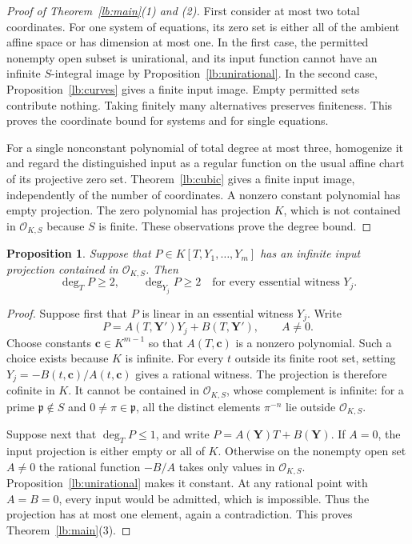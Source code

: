 \documentclass[11pt,a4paper]{article}
\newtheorem{proposition}[theorem]{Proposition}
\theoremstyle{definition}
\newcommand{\OKS}{\mathcal O_{K,S}}
\begin{document}
\begin{proof}[Proof of Theorem~\ref{lb:main}(1) and (2)]
First consider at most two total coordinates. For one system of
equations, its zero set is either all of the ambient affine space
or has dimension at most one. In the first case, the permitted
nonempty open subset is unirational, and its input function cannot
have an infinite $S$-integral image by Proposition~\ref{lb:unirational}.
In the second case, Proposition~\ref{lb:curves} gives a finite
input image. Empty permitted sets contribute nothing. Taking
finitely many alternatives preserves finiteness. This proves the
coordinate bound for systems and for single equations.

For a single nonconstant polynomial of total degree at most three,
homogenize it and regard the distinguished input as a regular
function on the usual affine chart of its projective zero set.
Theorem~\ref{lb:cubic} gives a finite input image, independently
of the number of coordinates. A nonzero constant polynomial has
empty projection. The zero polynomial has projection $K$, which
is not contained in $\OKS$ because $S$ is finite. These observations
prove the degree bound.
\end{proof}

\begin{proposition}\label{lb:individual-degrees}
Suppose that $P\in K[T,Y_1,\ldots,Y_m]$ has an infinite input
projection contained in $\OKS$. Then
\[
                \deg_T P\ge2,
    \qquad \deg_{Y_j}P\ge2
          \quad\text{for every essential witness }Y_j.
\]
\end{proposition}
\begin{proof}
Suppose first that $P$ is linear in an essential witness $Y_j$.
Write
\[
             P=A(T,\mathbf Y')Y_j+B(T,\mathbf Y'),\qquad A\ne0.
\]
Choose constants $\mathbf c\in K^{m-1}$ so that
$A(T,\mathbf c)$ is a nonzero polynomial. Such a choice exists
because $K$ is infinite. For every $t$ outside its finite root
set, setting $Y_j=-B(t,\mathbf c)/A(t,\mathbf c)$ gives a
rational witness. The projection is therefore cofinite in $K$.
It cannot be contained in $\OKS$, whose complement is infinite:
for a prime $\mathfrak p\notin S$ and $0\ne\pi\in\mathfrak p$,
all the distinct elements $\pi^{-n}$ lie outside $\OKS$.

Suppose next that $\deg_TP\le1$, and write
$P=A(\mathbf Y)T+B(\mathbf Y)$. If $A=0$, the input projection
is either empty or all of $K$. Otherwise on the nonempty open
set $A\ne0$ the rational function $-B/A$ takes only values in
$\OKS$. Proposition~\ref{lb:unirational} makes it constant.
At any rational point with $A=B=0$, every input would be admitted,
which is impossible. Thus the projection has at most one element,
again a contradiction. This proves Theorem~\ref{lb:main}(3).
\end{proof}
\end{document}

